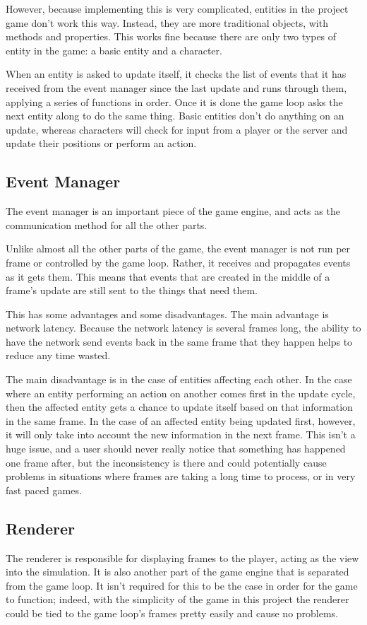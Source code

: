 However, because implementing this is very complicated, entities in the project game don't work this way. Instead, they are more traditional objects, with methods and properties. This works fine because there are only two types of entity in the game: a basic entity and a character.

When an entity is asked to update itself, it checks the list of events that it has received from the event manager since the last update and runs through them, applying a series of functions in order. Once it is done the game loop asks the next entity along to do the same thing. Basic entities don't do anything on an update, whereas characters will check for input from a player or the server and update their positions or perform an action.

\subsection{Event Manager}
The event manager is an important piece of the game engine, and acts as the communication method for all the other parts.

Unlike almost all the other parts of the game, the event manager is not run per frame or controlled by the game loop. Rather, it receives and propagates events as it gets them. This means that events that are created in the middle of a frame's update are still sent to the things that need them.

This has some advantages and some disadvantages. The main advantage is network latency. Because the network latency is several frames long, the ability to have the network send events back in the same frame that they happen helps to reduce any time wasted.

The main disadvantage is in the case of entities affecting each other. In the case where an entity performing an action on another comes first in the update cycle, then the affected entity gets a chance to update itself based on that information in the same frame. In the case of an affected entity being updated first, however, it will only take into account the new information in the next frame. This isn't a huge issue, and a user should never really notice that something has happened one frame after, but the inconsistency is there and could potentially cause problems in situations where frames are taking a long time to process, or in very fast paced games.

\subsection{Renderer}
The renderer is responsible for displaying frames to the player, acting as the view into the simulation. It is also another part of the game engine that is separated from the game loop. It isn't required for this to be the case in order for the game to function; indeed, with the simplicity of the game in this project the renderer could be tied to the game loop's frames pretty easily and cause no problems.

